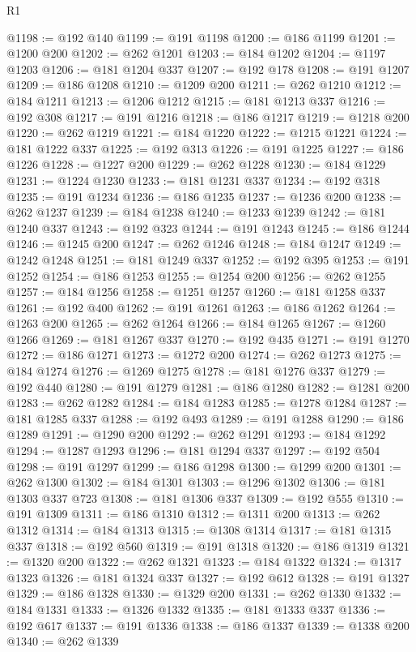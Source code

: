 \begin{lexlean}{R1}
\begin{coremodule}
@1198 := @192 @140
@1199 := @191 @1198
@1200 := @186 @1199
@1201 := @1200 @200
@1202 := @262 @1201
@1203 := @184 @1202
@1204 := @1197 @1203
@1206 := @181 @1204 @337
@1207 := @192 @178
@1208 := @191 @1207
@1209 := @186 @1208
@1210 := @1209 @200
@1211 := @262 @1210
@1212 := @184 @1211
@1213 := @1206 @1212
@1215 := @181 @1213 @337
@1216 := @192 @308
@1217 := @191 @1216
@1218 := @186 @1217
@1219 := @1218 @200
@1220 := @262 @1219
@1221 := @184 @1220
@1222 := @1215 @1221
@1224 := @181 @1222 @337
@1225 := @192 @313
@1226 := @191 @1225
@1227 := @186 @1226
@1228 := @1227 @200
@1229 := @262 @1228
@1230 := @184 @1229
@1231 := @1224 @1230
@1233 := @181 @1231 @337
@1234 := @192 @318
@1235 := @191 @1234
@1236 := @186 @1235
@1237 := @1236 @200
@1238 := @262 @1237
@1239 := @184 @1238
@1240 := @1233 @1239
@1242 := @181 @1240 @337
@1243 := @192 @323
@1244 := @191 @1243
@1245 := @186 @1244
@1246 := @1245 @200
@1247 := @262 @1246
@1248 := @184 @1247
@1249 := @1242 @1248
@1251 := @181 @1249 @337
@1252 := @192 @395
@1253 := @191 @1252
@1254 := @186 @1253
@1255 := @1254 @200
@1256 := @262 @1255
@1257 := @184 @1256
@1258 := @1251 @1257
@1260 := @181 @1258 @337
@1261 := @192 @400
@1262 := @191 @1261
@1263 := @186 @1262
@1264 := @1263 @200
@1265 := @262 @1264
@1266 := @184 @1265
@1267 := @1260 @1266
@1269 := @181 @1267 @337
@1270 := @192 @435
@1271 := @191 @1270
@1272 := @186 @1271
@1273 := @1272 @200
@1274 := @262 @1273
@1275 := @184 @1274
@1276 := @1269 @1275
@1278 := @181 @1276 @337
@1279 := @192 @440
@1280 := @191 @1279
@1281 := @186 @1280
@1282 := @1281 @200
@1283 := @262 @1282
@1284 := @184 @1283
@1285 := @1278 @1284
@1287 := @181 @1285 @337
@1288 := @192 @493
@1289 := @191 @1288
@1290 := @186 @1289
@1291 := @1290 @200
@1292 := @262 @1291
@1293 := @184 @1292
@1294 := @1287 @1293
@1296 := @181 @1294 @337
@1297 := @192 @504
@1298 := @191 @1297
@1299 := @186 @1298
@1300 := @1299 @200
@1301 := @262 @1300
@1302 := @184 @1301
@1303 := @1296 @1302
@1306 := @181 @1303 @337 @723
@1308 := @181 @1306 @337
@1309 := @192 @555
@1310 := @191 @1309
@1311 := @186 @1310
@1312 := @1311 @200
@1313 := @262 @1312
@1314 := @184 @1313
@1315 := @1308 @1314
@1317 := @181 @1315 @337
@1318 := @192 @560
@1319 := @191 @1318
@1320 := @186 @1319
@1321 := @1320 @200
@1322 := @262 @1321
@1323 := @184 @1322
@1324 := @1317 @1323
@1326 := @181 @1324 @337
@1327 := @192 @612
@1328 := @191 @1327
@1329 := @186 @1328
@1330 := @1329 @200
@1331 := @262 @1330
@1332 := @184 @1331
@1333 := @1326 @1332
@1335 := @181 @1333 @337
@1336 := @192 @617
@1337 := @191 @1336
@1338 := @186 @1337
@1339 := @1338 @200
@1340 := @262 @1339

\end{coremodule}
\end{lexlean}
